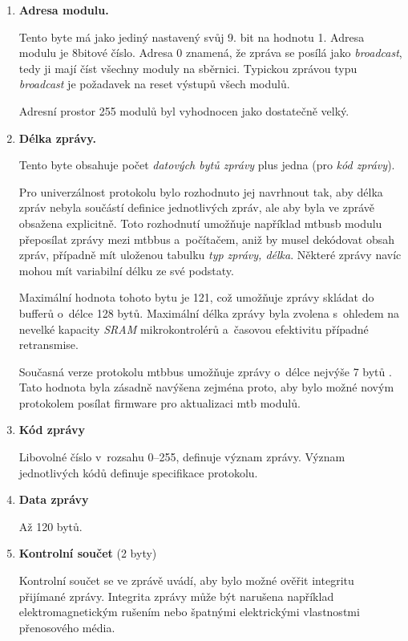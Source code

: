 \begin{enumerate}
\item \textbf{Adresa modulu.}

Tento byte má jako jediný nastavený svůj 9. bit na hodnotu 1.
Adresa modulu je 8bitové číslo. Adresa 0 znamená, že zpráva se posílá
jako \textit{broadcast}, tedy ji mají číst všechny moduly na sběrnici. Typickou
zprávou typu \textit{broadcast} je požadavek na reset výstupů všech modulů.

Adresní prostor 255 modulů byl vyhodnocen jako dostatečně velký.

\item \textbf{Délka zprávy.}

Tento byte obsahuje počet \textit{datových bytů zprávy} plus jedna (pro
\textit{kód zprávy}).

Pro univerzálnost protokolu bylo rozhodnuto jej navrhnout tak, aby délka zpráv
nebyla součástí definice jednotlivých zpráv, ale aby byla ve zprávě obsažena
explicitně. Toto rozhodnutí umožňuje například \gls{mtbusb} modulu
přeposílat zprávy mezi \gls{mtbbus} a~počítačem, aniž by musel dekódovat obsah
zpráv, případně mít uloženou tabulku \textit{typ zprávy, délka}. Některé zprávy
navíc mohou mít variabilní délku ze své podstaty.

Maximální hodnota tohoto bytu je 121, což umožňuje zprávy skládat do bufferů
o~délce 128 bytů. Maximální délka zprávy byla zvolena s~ohledem na nevelké
kapacity \textit{SRAM} mikrokontrolérů a~časovou efektivitu případné
retransmise.

Současná verze protokolu \gls{mtbbus} umožňuje zprávy o~délce nejvýše 7 bytů
\cite{mtbbus-specs}.  Tato hodnota byla zásadně navýšena zejména proto, aby
bylo možné novým protokolem posílat firmware pro aktualizaci \gls{mtb} modulů.

\item \textbf{Kód zprávy}

Libovolné číslo v~rozsahu 0–255, definuje význam zprávy. Význam jednotlivých
kódů definuje specifikace protokolu.

\item \textbf{Data zprávy}

Až 120 bytů.

\item \textbf{Kontrolní součet} (2 byty)

Kontrolní součet se ve zprávě uvádí, aby bylo možné ověřit integritu přijímané
zprávy. Integrita zprávy může být narušena například elektromagnetickým rušením
nebo špatnými elektrickými vlastnostmi přenosového média.


\end{enumerate}
